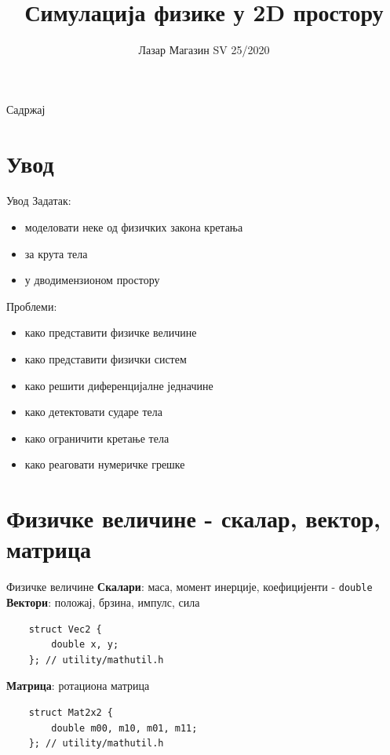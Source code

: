 \documentclass[]{beamer}
\title[]{Симулација физике у 2D простору}
\author[magley] {Лазар Магазин SV 25/2020}
\institute[FTN] {Факултет техничких наука \\ Универзитет у Новом Саду}
\begin{document}
\begin{frame}
    \titlepage
\end{frame}


\begin{frame}{Садржај}
    \tableofcontents
\end{frame}


\AtBeginSection{}
\section{Увод}
\begin{frame}{Увод}
    Задатак:
    \begin{itemize}
    \item моделовати неке од физичких закона кретања
    \item за крута тела
    \item у дводимензионом простору
    \end{itemize}
    Проблеми:
    \begin{itemize}
    \item како представити физичке величине
    \item како представити физички систем
    \item како решити диференцијалне једначине
    \item како детектовати сударе тела
    \item како ограничити кретање тела
    \item како реаговати нумеричке грешке
    \end{itemize}
\end{frame}


\section{Физичке величине - скалар, вектор, матрица}
\begin{frame}[fragile]{Физичке величине}
    \textbf{Скалари}: маса, момент инерције, коефицијенти - \texttt{double} \\
    \textbf{Вектори}: положај, брзина, импулс, сила
    
    \begin{verbatim}
    struct Vec2 {
        double x, y;
    }; // utility/mathutil.h
    \end{verbatim}
    
    \textbf{Матрица}: ротациона матрица
    
    \begin{verbatim}
    struct Mat2x2 {
        double m00, m10, m01, m11;
    }; // utility/mathutil.h
    \end{verbatim}
    
\end{frame}
\end{document}
